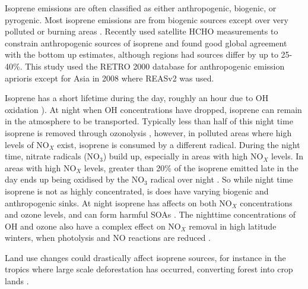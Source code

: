    Isoprene emissions are often classified as either anthropogenic, biogenic, or pyrogenic. 
    Most isoprene emissions are from biogenic sources except over very polluted or burning areas \citep{Guenther2006}.
    Recently \cite{Stavrakou2015} used satellite HCHO measurements to constrain anthropogenic sources of isoprene and found good global agreement with the bottom up estimates, although regions had sources differ by up to 25-40\%. 
    This study used the RETRO 2000 database for anthropogenic emission aprioris except for Asia in 2008 where REASv2 was used. 
    
    Isoprene has a short lifetime during the day, roughly an hour due to OH oxidation \citep{AtkinsonArey2003}).
    At night when OH concentrations have dropped, isoprene can remain in the atmosphere to be transported. 
    Typically less than half of this night time isoprene is removed through ozonolysis \citep{AtkinsonArey2003}, however, in polluted areas where high levels of NO$_X$ exist, isoprene is consumed by a different radical.
    During the night time, nitrate radicals (NO$_3$) build up, especially in areas with high NO$_X$ levels.
    In areas with high NO$_X$ levels, greater than 20\% of the isoprene emitted late in the day ends up being oxidised by the NO$_3$ radical over night \citep{Brown2009}.
    So while night time isoprene is not as highly concentrated, is does have varying biogenic and anthropogenic sinks.
    At night isoprene has affects on both NO$_X$ concentrations and ozone levels, and can form harmful SOAs \citep{Brown2009, Mao2013}.
    The nighttime  concentrations of OH and ozone also have a complex effect on NO$_X$ removal in high latitude winters, when photolysis and NO reactions are reduced \citep{Ayers2006}.
    
    Land use changes could drastically affect isoprene sources, for instance in the tropics where large scale deforestation has occurred, converting forest into crop lands \citep{Kanakidou2005}.
    
